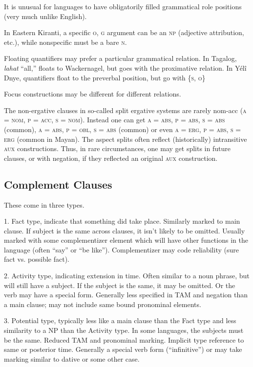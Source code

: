 \documentclass[11pt]{article}
\newcommand{\I}[1]{\textsc{#1}}   %
\begin{document}
{It is unusual for languages to have obligatorily filled grammatical
role positions (very much unlike English).

In Eastern Kiranti, a specific \I{o, g} argument can be an \I{np}
(adjective attribution, etc.), while nonspecific must be a bare
\I{n}.

Floating quantifiers may prefer a particular grammatical relation.  In
Tagalog, \textit{lahat} ``all,'' floats to Wackernagel, but goes with
the proximative relation.  In Yélî Dnye, quantifiers float to the
preverbal position, but go with \{\I{s, o}\}

Focus constructions may be different for different relations.

The non-ergative clauses in so-called split ergative systems are
rarely nom-acc (\I{a = nom, p = acc, s = nom}).  Instead one can get
\I{a = abs, p = abs, s = abs} (common), \I{a = abs, p = obl, s = abs}
(common) or even \I{a = erg, p = abs, s = erg} (common in Mayan).  The
aspect splits often reflect (historically) intransitive \I{aux}
constructions.  Thus, in rare circumstances, one may get splits in
future clauses, or with negation, if they reflected an original
\I{aux} construction.


\subsection{Complement Clauses}
These come in three types.

1.  Fact type, indicate that something did take place.  Similarly
marked to main clause.  If subject is the same across clauses, it
isn't likely to be omitted.  Usually marked with some complementizer
element which will have other functions in the language (often ``say''
or ``be like'').  Complementizer may code reliability (sure fact
vs. possible fact).

2. Activity type, indicating extension in time.  Often similar to a
noun phrase, but will still have a subject.  If the subject is the
same, it may be omitted.  Or the verb may have a special form.
Generally less specified in TAM and negation than a main clause; may
not include same bound pronominal elements.

3. Potential type, typically less like a main clause than the Fact
type and less similarity to a NP than the Activity type.  In some
languages, the subjects must be the same.  Reduced TAM and pronominal
marking.  Implicit type reference to same or posterior time.
Generally a special verb form (``infinitive'') or may take marking
similar to dative or some other case.

}
\end{document}
